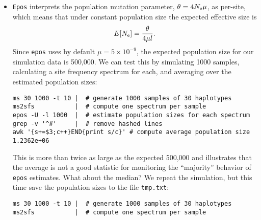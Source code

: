 \documentclass[a4paper, english]{article}
\newcommand{\ty}{\texttt}
\begin{document}
\begin{itemize}
\begin{verbatim}
ms 30 1 -t 10 
\end{verbatim}
This can automatically be converted to a site frequency spectrum using
my program \ty{ms2sfs}\footnote{\ty{https://www.github.com/evolbioinf/sfs}}:
\begin{verbatim}
ms 30 1 -t 10 | ms2sfs
\end{verbatim}
Finally, \ty{epos} reads the spectrum and estimates population
sizes from it:
\begin{verbatim}
ms 30 1 -t 10 | ms2sfs | epos -U -l 1000
#InputFile: stdin
#Polymorphic sites surveyed:         55
#Monomorphic sites surveyed:        945
#m = 1; maximum Log(Likelihood):     -52.219407 {2}
#m = 2; maximum Log(Likelihood):     -43.733126 {2,9}
#m = 3; maximum Log(Likelihood):     -42.565671 {2,3,9}
#Final Log(Likelihood):              -43.733126
#d^2: 2.15424
#Level  T[Level]        N[Level]
9       5.66e+05        1.54e+06
2       1.43e+06        2.47e+05
\end{verbatim}
where \ty{-U} indicates an unfolded site frequency spectrum. Since
this is a simulation, your results from now on are bound to differ
from mine in
numerical detail, though not in the general trend.
\item \ty{Epos} interprets the population mutation parameter,
$\theta=4N_{\rm e}\mu$, as per-site, which means that under constant
population size the expected effective size is
\[
E[N_{\rm e}]=\frac{\theta}{4\mu l}.
\]
Since \ty{epos} uses by default $\mu=5\times 10^{-9}$, the expected
population size for our simulation data is 500,000. We can
test this by simulating 1000 samples, calculating a site frequency
spectrum for each, and averaging over the estimated population
sizes:
\begin{verbatim}
ms 30 1000 -t 10 |  # generate 1000 samples of 30 haplotypes
ms2sfs           |  # compute one spectrum per sample
epos -U -l 1000  |  # estimate population sizes for each spectrum
grep -v '^#'     |  # remove hashed lines
awk '{s+=$3;c++}END{print s/c}' # compute average population size
1.2362e+06
\end{verbatim}
This is more than twice as large as the expected 500,000 and
illustrates that the average is not a good statistic for monitoring
the ``majority'' behavior of \ty{epos} estimates. What about the
median? We repeat the simulation, but this time save the population
sizes to the file \ty{tmp.txt}:
\begin{verbatim}
ms 30 1000 -t 10 |  # generate 1000 samples of 30 haplotypes
ms2sfs           |  # compute one spectrum per sample

\end{verbatim}
\end{itemize}
\end{document}
